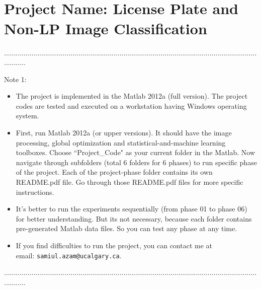 \documentclass[a4paper,12pt]{article} %
\begin{document}
\pagestyle{fancy}
 \renewcommand{\headrulewidth}{1pt}
\sectionfont{\fontsize{12}{15}\selectfont}
\vspace{2cm}


\section*{\\Project Name: License Plate and Non-LP Image Classification}
............................................................................................................................................

Note 1:
\begin{itemize}
	\item The project is implemented in the Matlab 2012a (full version). The project codes are tested and executed on a workstation having Windows operating system.
	
	\item First, run Matlab 2012a (or upper versions). It should have the image processing, global optimization and statistical-and-machine learning toolboxes. Choose ``Project\_Code" as your current folder in the Matlab. Now navigate through subfolders (total 6 folders for 6 phases) to run specific phase of the project. Each of the project-phase folder contains its own README.pdf file. Go through those README.pdf files for more specific instructions. 
	
	\item It's better to run the experiments sequentially (from phase 01 to phase 06) for better understanding. But its not necessary, because each folder contains pre-generated Matlab data files. So you can test any phase at any time.
	
	\item If you find difficulties to run the project, you can contact me at \\email: \verb|samiul.azam@ucalgary.ca|.
	
  	
\end{itemize}

............................................................................................................................................
\end{document}
